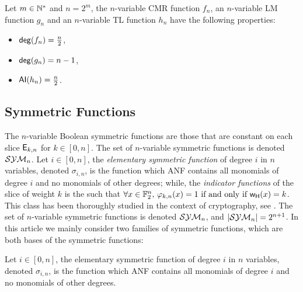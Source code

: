 \documentclass{llncs}
\begin{document}
\begin{Prop}\label{Prop:fam}
	
Let $m \in \mathbb{N}^*$ and $n=2^m$, the $n$-variable CMR function $f_n$, an $n$-variable LM function $g_n$ and an $n$-variable TL function $h_n$ have the following properties:
\begin{itemize}
	\item $\mathsf{deg}(f_n)=\frac{n}{2}$,
	\item $\mathsf{deg}(g_n)=n-1$,
	\item $\mathsf{AI}(h_n)=\frac{n}{2}$.	
\end{itemize}
	
\end{Prop}
\fi
\ifnum{}
\else
\subsection{Symmetric Functions}%
\fi

The $n$-variable Boolean symmetric functions are those that are constant on each slice $\mathsf{E}_{k,n}$ for $k\in [0,n]$. 
\ifnum{}
The set of $n$-variable symmetric functions is denoted $\mathcal{SYM}_{n}$. Let $i\in [0,n]$, the \emph{elementary symmetric function} of degree $i$ in $n$ variables, denoted $\sigma_{i,n}$, is the function which ANF contains all monomials of degree $i$ and no monomials of other degrees; while, the \emph{indicator functions} of the slice of weight $k$ is the such that $\forall  x\in \mathbb{F}_2^{n}, \, \varphi_{k,n}(x) = 1 \text{ if and only if } \mathsf{w_H}(x) = k$.
\else
This class has been thoroughly studied in the context of cryptography, see \eg \cite{IEEE:Carlet04,IEEE:CanVid05,INDO:BraPre05,DM:SarMai07,IEEE:QFLW09,Latin:Meaux19,CCDS:Meaux21,IEEE:CarMea22}.
The set of $n$-variable symmetric functions is denoted $\mathcal{SYM}_{n}$, and $|\mathcal{SYM}_{n}|=2^{n+1}$. 
In this article we mainly consider two families of symmetric functions, which are both bases of the symmetric functions:

\begin{definition}\label{def:elemsymm}
Let $i\in [0,n]$, the elementary symmetric function of degree $i$ in $n$ variables, denoted $\sigma_{i,n}$, is the function which ANF contains all monomials of degree $i$ and no monomials of other degrees. 
\end{definition}
\end{document}
